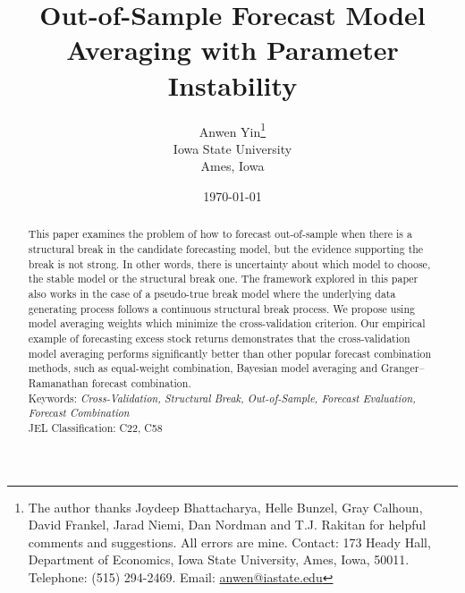 \documentclass[a4paper,12pt]{article}
\begin{document}
\newtheorem{theorem}{Theorem}[section]
\newtheorem{lemma}[theorem]{Lemma}
\newtheorem{proposition}[theorem]{Proposition}
\newtheorem{corollary}[theorem]{Corollary}
\newtheorem{Assumption}{Assumption}

\title{Out-of-Sample Forecast Model Averaging with Parameter Instability}
\author{Anwen Yin\thanks{The author thanks Joydeep Bhattacharya, Helle Bunzel, Gray Calhoun, David Frankel, Jarad Niemi, Dan Nordman and T.J. Rakitan for helpful comments and suggestions. All errors are mine. Contact: 173 Heady Hall, Department of Economics, Iowa State University, Ames, Iowa, 50011. Telephone: (515) 294-2469. Email: \href{mailto:anwen@iastate.edu}{anwen@iastate.edu}} \\ Iowa State University\\Ames, Iowa}
\date{\today}

\maketitle

\begin{abstract}
  \noindent This paper examines the problem of how to forecast out-of-sample when there is a structural break in the candidate forecasting model, but the evidence supporting the break is not strong. In other words, there is uncertainty about which model to choose, the stable model or the structural break one.  The framework explored in this paper also works in the case of a pseudo-true break model where the underlying data generating process follows a continuous structural break process. We propose using model averaging weights which minimize the cross-validation criterion. Our empirical example of forecasting excess stock returns demonstrates that the cross-validation model averaging performs significantly better than other popular forecast combination methods, such as equal-weight combination, Bayesian model averaging and Granger--Ramanathan forecast combination.   \\

  \noindent Keywords: \emph{Cross-Validation, Structural Break, Out-of-Sample, Forecast Evaluation, Forecast Combination}\\

  \noindent \textsc{JEL} Classification: C22, C58
\end{abstract}
\newpage
\doublespacing
\end{document}
